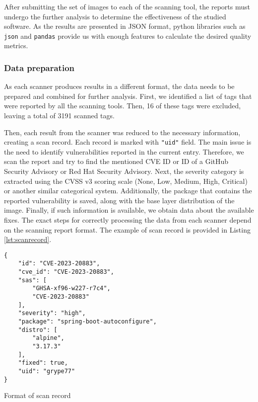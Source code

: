 After submitting the set of images to each of the scanning tool, the reports must undergo the further analysis to determine the effectiveness of the studied software. As the results are presented in JSON format, python libraries such as \texttt{json} and \texttt{pandas} provide us with enough features to calculate the desired quality metrics. 

\subsubsection*{Data preparation}

As each scanner produces results in a different format, the data needs to be prepared and combined for further analysis. First, we identified a list of tags that were reported by all the scanning tools. Then, 16 of these tags were excluded, leaving a total of 3191 scanned tags.

Then, each result from the scanner was reduced to the necessary information, creating a scan record. Each record is marked with \texttt{"uid"} field. The main issue is the need to identify vulnerabilities reported in the current entry. Therefore, we scan the report and try to find the mentioned CVE ID or ID of a GitHub Security Advisory or Red Hat Security Advisory. Next, the severity category is extracted using the CVSS v3 scoring scale (None, Low, Medium, High, Critical) or another similar categorical system. Additionally, the package that contains the reported vulnerability is saved, along with the base layer distribution of the image. Finally, if such information is available, we obtain data about the available fixes. The exact steps for correctly processing the data from each scanner depend on the scanning report format. The example of scan record is provided in Listing \ref{lst:scanrecord}.


\begin{listing}[htp]
    \centering
    \begin{minipage}{0.7\linewidth}
        \begin{verbatim}
{
    "id": "CVE-2023-20883",
    "cve_id": "CVE-2023-20883",
    "sas": [
        "GHSA-xf96-w227-r7c4",
        "CVE-2023-20883"
    ],
    "severity": "high",
    "package": "spring-boot-autoconfigure",
    "distro": [
        "alpine",
        "3.17.3"
    ],
    "fixed": true,
    "uid": "grype77"
}
        \end{verbatim}
    \end{minipage}
    \caption{Format of scan record}
    \label{lst:scanrecord}
\end{listing}

